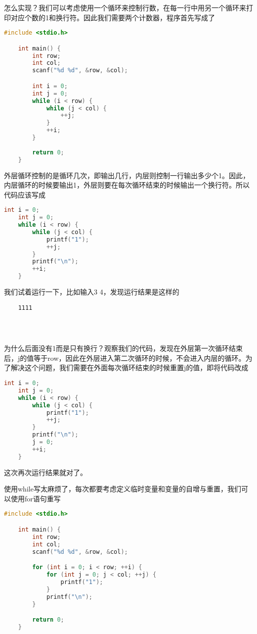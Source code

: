 怎么实现？我们可以考虑使用一个循环来控制行数，在每一行中用另一个循环来打印对应个数的1和换行符。因此我们需要两个计数器，程序首先写成了

\begin{lstlisting}[language=c]
    #include <stdio.h>

    int main() {
        int row;
        int col;
        scanf("%d %d", &row, &col);

        int i = 0;
        int j = 0;
        while (i < row) {
            while (j < col) {
                ++j; 
            }
            ++i;
        }
        
        return 0;
    }
\end{lstlisting}

外层循环控制的是循环几次，即输出几行，内层则控制一行输出多少个1。因此，内层循环的时候要输出1，外层则要在每次循环结束的时候输出一个换行符。所以代码应该写成

\begin{lstlisting}[language=c]
    int i = 0;
    int j = 0;
    while (i < row) {
        while (j < col) {
            printf("1");
            ++j; 
        }
        printf("\n");
        ++i;
    }
\end{lstlisting}

我们试着运行一下，比如输入3 4，发现运行结果是这样的

\begin{mdframed}
\begin{verbatim}
    1111




\end{verbatim}
\end{mdframed}

为什么后面没有1而是只有换行？观察我们的代码，发现在外层第一次循环结束后，j的值等于row，因此在外层进入第二次循环的时候，不会进入内层的循环。为了解决这个问题，我们需要在外面每次循环结束的时候重置j的值，即将代码改成

\begin{lstlisting}[language=c]
    int i = 0;
    int j = 0;
    while (i < row) {
        while (j < col) {
            printf("1");
            ++j; 
        }
        printf("\n");
        j = 0;
        ++i;
    }
\end{lstlisting}

这次再次运行结果就对了。

使用while写太麻烦了，每次都要考虑定义临时变量和变量的自增与重置，我们可以使用for语句重写

\begin{lstlisting}[language=c]
    #include <stdio.h>

    int main() {
        int row;
        int col;
        scanf("%d %d", &row, &col);

        for (int i = 0; i < row; ++i) {
            for (int j = 0; j < col; ++j) {
                printf("1");
            }
            printf("\n");
        }

        return 0;
    }
\end{lstlisting}

